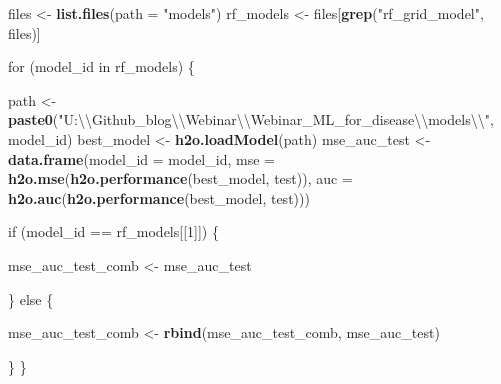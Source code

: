 \documentclass[]{article}
\newenvironment{Shaded}{\begin{snugshade}}{\end{snugshade}}
\newcommand{\KeywordTok}[1]{\textcolor[rgb]{0.13,0.29,0.53}{\textbf{{#1}}}}
\newcommand{\DataTypeTok}[1]{\textcolor[rgb]{0.13,0.29,0.53}{{#1}}}
\newcommand{\DecValTok}[1]{\textcolor[rgb]{0.00,0.00,0.81}{{#1}}}
\newcommand{\CharTok}[1]{\textcolor[rgb]{0.31,0.60,0.02}{{#1}}}
\newcommand{\StringTok}[1]{\textcolor[rgb]{0.31,0.60,0.02}{{#1}}}
\newcommand{\NormalTok}[1]{{#1}}
\begin{document}
\begin{Shaded}
\begin{Highlighting}[]
\NormalTok{files <-}\StringTok{ }\KeywordTok{list.files}\NormalTok{(}\DataTypeTok{path =} \StringTok{"models"}\NormalTok{)}
\NormalTok{rf_models <-}\StringTok{ }\NormalTok{files[}\KeywordTok{grep}\NormalTok{(}\StringTok{"rf_grid_model"}\NormalTok{, files)]}

\NormalTok{for (model_id in rf_models) \{}
  
  \NormalTok{path <-}\StringTok{ }\KeywordTok{paste0}\NormalTok{(}\StringTok{"U:}\CharTok{\textbackslash{}\textbackslash{}}\StringTok{Github_blog}\CharTok{\textbackslash{}\textbackslash{}}\StringTok{Webinar}\CharTok{\textbackslash{}\textbackslash{}}\StringTok{Webinar_ML_for_disease}\CharTok{\textbackslash{}\textbackslash{}}\StringTok{models}\CharTok{\textbackslash{}\textbackslash{}}\StringTok{"}\NormalTok{, model_id)}
  \NormalTok{best_model <-}\StringTok{ }\KeywordTok{h2o.loadModel}\NormalTok{(path)}
  \NormalTok{mse_auc_test <-}\StringTok{ }\KeywordTok{data.frame}\NormalTok{(}\DataTypeTok{model_id =} \NormalTok{model_id, }
                             \DataTypeTok{mse =} \KeywordTok{h2o.mse}\NormalTok{(}\KeywordTok{h2o.performance}\NormalTok{(best_model, test)),}
                             \DataTypeTok{auc =} \KeywordTok{h2o.auc}\NormalTok{(}\KeywordTok{h2o.performance}\NormalTok{(best_model, test)))}
  
  \NormalTok{if (model_id ==}\StringTok{ }\NormalTok{rf_models[[}\DecValTok{1}\NormalTok{]]) \{}
    
    \NormalTok{mse_auc_test_comb <-}\StringTok{ }\NormalTok{mse_auc_test}
    
  \NormalTok{\} else \{}
    
    \NormalTok{mse_auc_test_comb <-}\StringTok{ }\KeywordTok{rbind}\NormalTok{(mse_auc_test_comb, mse_auc_test)}
    
  \NormalTok{\}}
\NormalTok{\}}


\end{Highlighting}
\end{Shaded}
\end{document}
